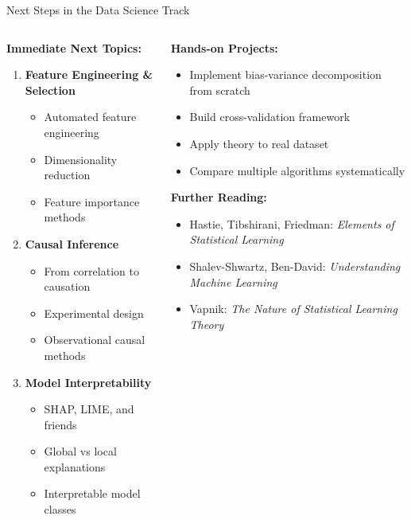 \documentclass[aspectratio=169,11pt]{beamer}
\begin{document}
\begin{frame}{Next Steps in the Data Science Track}
\begin{columns}
\begin{column}{0.5\textwidth}
\textbf{Immediate Next Topics:}
\begin{enumerate}
\item \textbf{Feature Engineering \& Selection}
   \begin{itemize}
   \item Automated feature engineering
   \item Dimensionality reduction
   \item Feature importance methods
   \end{itemize}

\item \textbf{Causal Inference}
   \begin{itemize}
   \item From correlation to causation
   \item Experimental design
   \item Observational causal methods
   \end{itemize}

\item \textbf{Model Interpretability}
   \begin{itemize}
   \item SHAP, LIME, and friends
   \item Global vs local explanations
   \item Interpretable model classes
   \end{itemize}
\end{enumerate}
\end{column}
\begin{column}{0.5\textwidth}
\textbf{Hands-on Projects:}
\begin{itemize}
\item Implement bias-variance decomposition from scratch
\item Build cross-validation framework
\item Apply theory to real dataset
\item Compare multiple algorithms systematically
\end{itemize}

\vspace{0.3cm}
\textbf{Further Reading:}
\begin{itemize}
\item Hastie, Tibshirani, Friedman: \emph{Elements of Statistical Learning}
\item Shalev-Shwartz, Ben-David: \emph{Understanding Machine Learning}
\item Vapnik: \emph{The Nature of Statistical Learning Theory}
\end{itemize}
\end{column}
\end{columns}


\end{frame}
\end{document}
